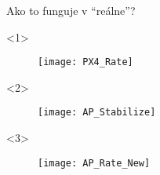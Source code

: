 \begin{frame}{Ako to funguje v ``reálne''?}
\begin{onlyenv}<1>
  \begin{figure}
\centering
  \texttt{[image: PX4\_Rate]}\\
\end{figure}
\end{onlyenv}

\begin{onlyenv}<2>
  \begin{figure}
\centering
  \texttt{[image: AP\_Stabilize]}\\
\end{figure}
\end{onlyenv}

\begin{onlyenv}<3>
  \begin{figure}
\centering
  \texttt{[image: AP\_Rate\_New]}\\
\end{figure}
\end{onlyenv}

\end{frame}


